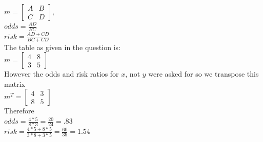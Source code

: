 \documentclass{article}
\begin{document}
$ m = 
\begin{bmatrix}
  A & B \\
  C & D
\end{bmatrix},
$ ~\\

$odds = \frac{AD}{BC}$ ~\\

$risk = \frac{AD + CD}{BC + CD}$ ~\\

The table as given in the question is: ~\\

$ m = 
\begin{bmatrix}
  4 & 8 \\
  3 & 5
\end{bmatrix}
$ ~\\

However the odds and risk ratios for $x$, not $y$ were asked for so we transpose this matrix ~\\

$m^{T} = 
\begin{bmatrix}
  4 & 3 \\
  8 & 5
\end{bmatrix}
$ ~\\

Therefore ~\\

$odds = \frac{4*5}{8*3} = \frac{20}{24} = .83 $ ~\\

$risk = \frac{4*5+8*5}{3*8+3*5} = \frac{60}{39} = 1.54 $ ~\\
\end{document}
